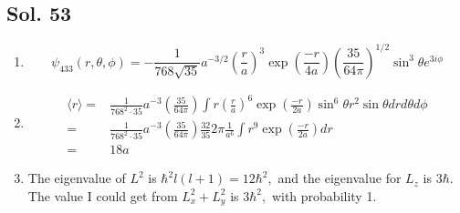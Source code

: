         \subsection*{Sol. 53}
        \begin{enumerate}
            \item 
            $$
            \psi_{433}(r,\theta,\phi)
            =-\frac{1}{768\sqrt{35}}
            a^{-3/2}
            \left(\frac{r}{a}\right)^{3}
            \exp\left(\frac{-r}{4a}\right)
            \left(\frac{35}{64\pi}\right)^{1/2}
            \sin^3\theta e^{3i\phi}
            $$
            \item 
            \begin{align*}
                \langle r\rangle
                =&
                \frac{1}{768^2\cdot 35}
            a^{-3}
            \left(\frac{35}{64\pi}\right)
                \int 
                r
            \left(\frac{r}{a}\right)^{6}
            \exp\left(\frac{-r}{2a}\right)
            \sin^6\theta
            r^2\sin\theta  
            drd\theta d\phi \\
            =&
            \frac{1}{768^2\cdot 35}
            a^{-3}
            \left(\frac{35}{64\pi}\right)
            \frac{32}{35}
            2\pi
            \frac{1}{a^6}
                \int 
                r^9            
            \exp\left(\frac{-r}{2a}\right)
            dr\\
            =& 
            18a
            \end{align*}
            \item 
            The eigenvalue of $L^2$ is $\hbar^2l(l+1)=12\hbar^2,$ and the eigenvalue for $L_z$ is $3\hbar.$ The value I could get from $L_x^2+L_y^2$ is $3\hbar^2,$ with probability 1.
        \end{enumerate}
